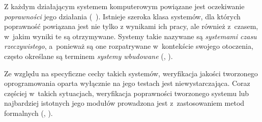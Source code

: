 \documentclass[a4paper,11pt]{article}
\begin{document}

 Z każdym działającym systemem komputerowym powiązane jest oczekiwanie 
{\em poprawności} jego działania (~\cite{Sommerville:2006:SE:1196763}). Istnieje szeroka 
klasa systemów, dla których poprawność powiązana jest nie tylko z 
wynikami ich pracy, ale również z~czasem, w~jakim wyniki te są 
otrzymywane. Systemy takie nazywane są {\em systemami czasu 
rzeczywistego}, a~ponieważ są one rozpatrywane  w~kontekście swojego 
otoczenia, często określane są terminem {\em systemy wbudowane} 
(\cite{Sommerville:2006:SE:1196763}, \cite{x}). 

Ze względu na specyficzne cechy takich systemów, weryfikacja jakości 
tworzonego oprogramowania oparta wyłącznie na jego testach jest 
niewystarczająca. Coraz częściej w~takich sytuacjach, weryfikacja 
poprawności tworzonego systemu lub najbardziej istotnych jego 
modułów prowadzona jest z~zastosowaniem metod formalnych 
(\cite{Alur:1990:AMR:90397.90438},\cite{x} ). 

{}
\end{document}
